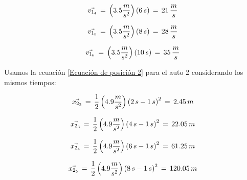 \documentclass[letterpaper, 12pt]{article}
\begin{document}
\begin{enumerate}
\begin{enumerate}
            \begin{equation}
                \label{1v4}
                \vec{v_{1_{4}}} \thinspace = \thinspace \left( 3.5 \frac{m}{s^{2}} \right) \left( 6 \thinspace s \right) \thinspace = \thinspace 21 \thinspace \frac{m}{s}
            \end{equation}
            
            \begin{equation}
                \label{1v5}
                \vec{v_{1_{5}}} \thinspace = \thinspace \left( 3.5 \frac{m}{s^{2}} \right) \left( 8 \thinspace s \right) \thinspace = \thinspace 28 \thinspace \frac{m}{s}
            \end{equation}
            
            \begin{equation}
                \label{1v6}
                \vec{v_{1_{6}}} \thinspace = \thinspace \left( 3.5 \frac{m}{s^{2}} \right) \left( 10 \thinspace s \right) \thinspace = \thinspace 35 \thinspace \frac{m}{s}
            \end{equation}
            
            Usamos la ecuación \ref{Ecuación de posición 2} para el auto 2 considerando los mismos tiempos:
            
            \begin{equation}
                \label{2p2}
                \vec{x_{2_{2}}} \thinspace = \thinspace \frac{1}{2} \left( 4.9 \frac{m}{s^{2}} \right) \left( 2\thinspace s -1 \thinspace s \right)^{2} \thinspace = \thinspace 2.45 \thinspace m
            \end{equation}
            
            \begin{equation}
                \label{2p3}
                \vec{x_{2_{3}}} \thinspace = \thinspace \frac{1}{2} \left( 4.9 \frac{m}{s^{2}} \right) \left( 4\thinspace s -1 \thinspace s \right)^{2} \thinspace = \thinspace 22.05 \thinspace m
            \end{equation}
            
            \begin{equation}
                \label{2p4}
                \vec{x_{2_{4}}} \thinspace = \thinspace \frac{1}{2} \left( 4.9 \frac{m}{s^{2}} \right) \left( 6\thinspace s -1 \thinspace s \right)^{2} \thinspace = \thinspace 61.25 \thinspace m
            \end{equation}
            
            \begin{equation}
                \label{2p5}
                \vec{x_{2_{5}}} \thinspace = \thinspace \frac{1}{2} \left( 4.9 \frac{m}{s^{2}} \right) \left( 8\thinspace s -1 \thinspace s \right)^{2} \thinspace = \thinspace 120.05 \thinspace m
            \end{equation}
            

\end{enumerate}
\end{enumerate}
\end{document}
